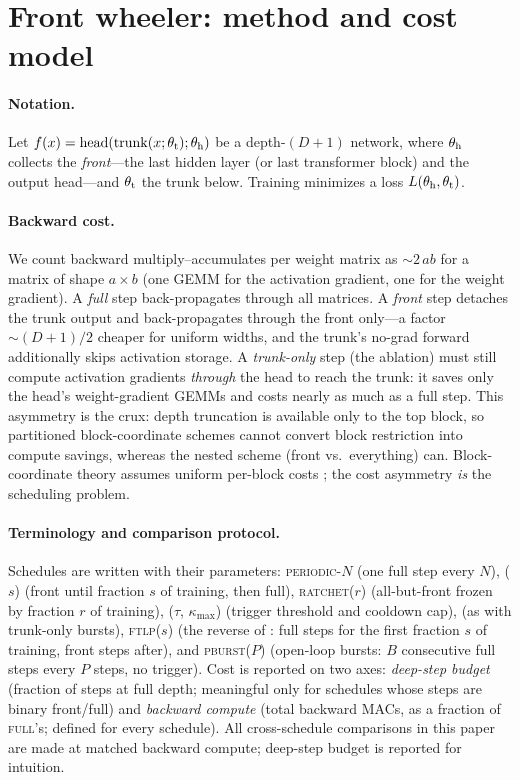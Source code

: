 \section{Front wheeler: method and cost model}
\label{sec:framework}

\paragraph{Notation.} Let $f(x) = \mathrm{head}(\mathrm{trunk}(x;\theta_{\mathrm{t}});\theta_{\mathrm{h}})$
be a depth-$(D{+}1)$ network, where $\theta_{\mathrm{h}}$ collects the \emph{front}---the
last hidden layer (or last transformer block) and the output head---and
$\theta_{\mathrm{t}}$ the trunk below. Training minimizes a loss $L(\theta_{\mathrm{h}},\theta_{\mathrm{t}})$.

\paragraph{Backward cost.} We count backward multiply--accumulates per
weight matrix as ${\sim}2\,ab$ for a matrix of shape $a\times b$ (one GEMM
for the activation gradient, one for the weight gradient). A \emph{full} step
back-propagates through all matrices. A \emph{front} step detaches the trunk
output and back-propagates through the front only---a factor ${\sim}(D{+}1)/2$
cheaper for uniform widths, and the trunk's no-grad forward additionally
skips activation storage. A \emph{trunk-only} step (the \bcd{} ablation)
must still compute activation gradients \emph{through} the head to reach the
trunk: it saves only the head's weight-gradient GEMMs and costs nearly as
much as a full step. This asymmetry is the crux: depth truncation is
available only to the top block, so partitioned block-coordinate schemes
cannot convert block restriction into compute savings, whereas the nested
scheme (front vs.\ everything) can. Block-coordinate theory assumes uniform
per-block costs \citep{nutini2015coordinate}; the cost asymmetry \emph{is}
the scheduling problem.

\paragraph{Terminology and comparison protocol.} Schedules are written
with their parameters: \textsc{periodic}-$N$ (one full step every $N$),
\lpft{}($s$) (front until fraction $s$ of training, then full),
\textsc{ratchet}($r$) (all-but-front frozen by fraction $r$ of training),
\fw{}($\tau$, $\kappa_{\max}$) (trigger threshold and cooldown cap),
\bcd{} (as \fw{} with trunk-only bursts), \textsc{ftlp}($s$) (the reverse
of \lpft{}: full steps for the first fraction $s$ of training, front steps
after), and \textsc{pburst}($P$) (open-loop bursts: $B$ consecutive full
steps every $P$ steps, no trigger). Cost is reported on two axes:
\emph{deep-step budget} (fraction of steps at full depth; meaningful only
for schedules whose steps are binary front/full) and \emph{backward
compute} (total backward MACs, as a fraction of \textsc{full}'s; defined
for every schedule). All cross-schedule comparisons in this paper are made
at matched backward compute; deep-step budget is reported for intuition.

